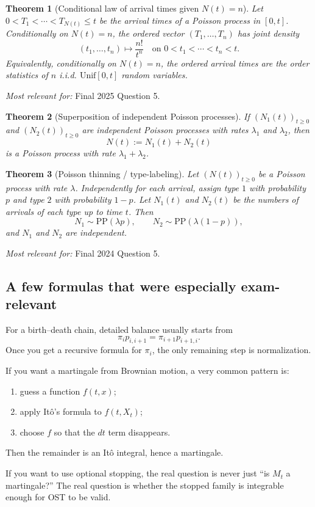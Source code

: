 \documentclass[11pt]{article}
\newtheorem{theorem}{Theorem}[section]
\theoremstyle{definition}
\begin{document}
\begin{theorem}[Conditional law of arrival times given $N(t)=n$]
Let $0<T_1<\cdots<T_{N(t)}\le t$ be the arrival times of a Poisson process in $[0,t]$. Conditionally on $N(t)=n$, the ordered vector $(T_1,\dots,T_n)$ has joint density
\[
(t_1,\dots,t_n) \mapsto \frac{n!}{t^n}
\quad \text{on } 0<t_1<\cdots<t_n<t.
\]
Equivalently, conditionally on $N(t)=n$, the ordered arrival times are the order statistics of $n$ i.i.d. $\mathrm{Unif}[0,t]$ random variables.
\end{theorem}

\emph{Most relevant for:} Final 2025 Question 5.

\begin{theorem}[Superposition of independent Poisson processes]
If $(N_1(t))_{t\ge 0}$ and $(N_2(t))_{t\ge 0}$ are independent Poisson processes with rates $\lambda_1$ and $\lambda_2$, then
\[
N(t):=N_1(t)+N_2(t)
\]
is a Poisson process with rate $\lambda_1+\lambda_2$.
\end{theorem}

\begin{theorem}[Poisson thinning / type-labeling]
Let $(N(t))_{t\ge 0}$ be a Poisson process with rate $\lambda$. Independently for each arrival, assign type $1$ with probability $p$ and type $2$ with probability $1-p$. Let $N_1(t)$ and $N_2(t)$ be the numbers of arrivals of each type up to time $t$. Then
\[
N_1 \sim \mathrm{PP}(\lambda p),
\qquad
N_2 \sim \mathrm{PP}(\lambda(1-p)),
\]
and $N_1$ and $N_2$ are independent.
\end{theorem}

\emph{Most relevant for:} Final 2024 Question 5.

\subsection{A few formulas that were especially exam-relevant}

\begin{keyformula}
For a birth--death chain, detailed balance usually starts from
\[
\pi_i p_{i,i+1} = \pi_{i+1} p_{i+1,i}.
\]
Once you get a recursive formula for $\pi_i$, the only remaining step is normalization.
\end{keyformula}

\begin{keyformula}
If you want a martingale from Brownian motion, a very common pattern is:
\begin{enumerate}[label=(\roman*)]
    \item guess a function $f(t,x)$;
    \item apply It\^o's formula to $f(t,X_t)$;
    \item choose $f$ so that the $dt$ term disappears.
\end{enumerate}
Then the remainder is an It\^o integral, hence a martingale.
\end{keyformula}

\begin{keyformula}
If you want to use optional stopping, the real question is never just ``is $M_t$ a martingale?'' The real question is whether the stopped family is integrable enough for OST to be valid.
\end{keyformula}
\end{document}
